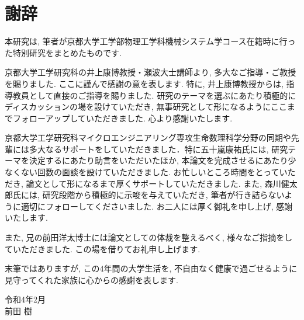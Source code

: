 
\chapter*{謝辞}

本研究は, 筆者が京都大学工学部物理工学科機械システム学コース在籍時に行った特別研究をまとめたものです.

京都大学工学研究科の井上康博教授・瀬波大士講師より, 多大なご指導・ご教授を賜りました. ここに謹んで感謝の意を表します. 特に, 井上康博教授からは, 指導教員として直接のご指導を賜りました. 研究のテーマを選ぶにあたり積極的にディスカッションの場を設けていただき, 無事研究として形になるようにここまでフォローアップしていただきました. 心より感謝いたします.

京都大学工学研究科マイクロエンジニアリング専攻生命数理科学分野の同期や先輩には多大なるサポートをしていただきました．特に五十嵐康祐氏には, 研究テーマを決定するにあたり助言をいただいたほか, 本論文を完成させるにあたり少なくない回数の面談を設けていただきました. お忙しいところ時間をとっていただき, 論文として形になるまで厚くサポートしていただきました. また, 森川健太郎氏には, 研究段階から積極的に示唆を与えていただき, 筆者が行き詰らないように適切にフォローしてくださいました. お二人には厚く御礼を申し上げ, 感謝いたします.

また, 兄の前田洋太博士には論文としての体裁を整えるべく, 様々なご指摘をしていただきました. この場を借りてお礼申し上げます.

末筆ではありますが, この4年間の大学生活を, 不自由なく健康で過ごせるように見守ってくれた家族に心からの感謝を表します.

\begin{flushright}
  令和4年2月\\
  前田 樹
\end{flushright}
